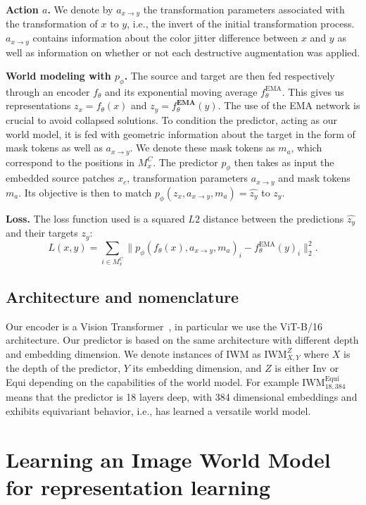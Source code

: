 \documentclass[twocolumn]{fairmeta}
\theoremstyle{plain}
\theoremstyle{definition}
\theoremstyle{remark}
\begin{document}
\textbf{Action $a$.} We denote by $a_{x\rightarrow y}$ the transformation parameters associated with the transformation of $x$ to $y$, i.e., the invert of the initial transformation process. $a_{x\rightarrow y}$ contains information about the color jitter difference between $x$ and $y$ as well as information on whether or not each destructive augmentation was applied.


\textbf{World modeling with $p_\phi$.}
The source and target are then fed respectively through an encoder $f_\theta$ and its exponential moving average $f_\theta^\text{EMA}$. This gives us representations $z_x = f_\theta(x)$ and $z_y = f_\theta^{\textbf{EMA}}(y)$. The use of the EMA network is crucial to avoid collapsed solutions.
To condition the predictor, acting as our world model, it is fed with geometric information about the target in the form of mask tokens as well as $a_{x\rightarrow y}$. We denote these mask tokens as $m_a$, which correspond to the positions in $M_x^C$.
The predictor $p_\phi$ then takes as input the embedded source patches $x_c$, transformation parameters $a_{x\rightarrow y}$ and mask tokens $m_a$. Its objective is then to match $p_\phi\left(z_x,a_{x\rightarrow y},m_a \right) = \hat{z_y}$ to $z_y$.

\textbf{Loss.} The loss function used is a squared $L2$ distance between the predictions $\hat{z_y}$ and their targets $z_y$: 
\begin{equation*}
    L(x,y) = \sum_{i\in M_x^C}\| p_\phi\left(f_\theta(x),a_{x\rightarrow y},m_a \right)_i
    - f_\theta^\text{EMA}(y)_i \|_2^2.
\end{equation*}


\subsection{Architecture and nomenclature}
Our encoder is a Vision Transformer~\citep{dosovitskiy2021vit}, in particular we use the ViT-B/16 architecture. Our predictor is based on the same architecture with different depth and embedding dimension. We denote instances of IWM as $\text{IWM}_{X,Y}^Z$ where $X$ is the depth of the predictor, $Y$ its embedding dimension, and $Z$ is either Inv or Equi depending on the capabilities of the world model. For example $\text{IWM}_{18,384}^\text{Equi}$ means that the predictor is 18 layers deep, with 384 dimensional embeddings and exhibits equivariant behavior, i.e., has learned a versatile world model.


\section{Learning an Image World Model for representation learning}
\end{document}
